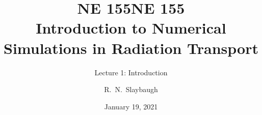 \documentclass[xcolor=x11names,compress]{beamer}
\title{NE 155}
\author{R.\ N.\ Slaybaugh}
\date{January 19, 2021}
\renewcommand{\(}{\begin{columns}}
\renewcommand{\)}{\end{columns}}
\newcommand{\<}[1]{\begin{column}{#1}}
\renewcommand{\>}{\end{column}}
\begin{document}
\begin{frame}
\title{NE 155\\Introduction to Numerical Simulations in Radiation Transport}
\subtitle{Lecture 1: Introduction}
\titlepage
\end{frame}


\end{document}
